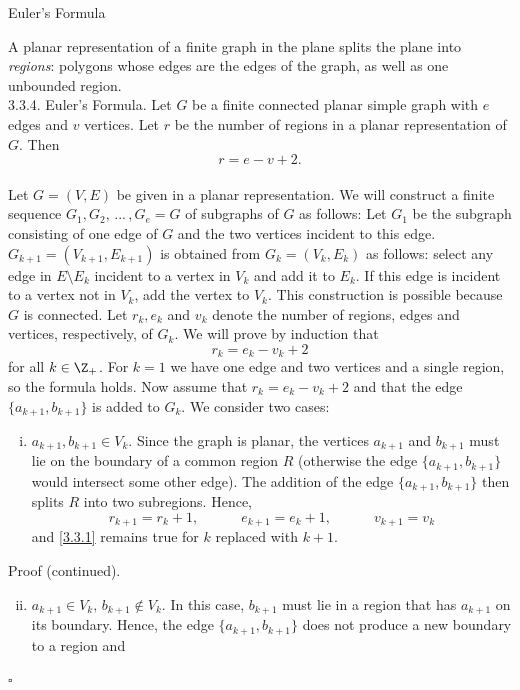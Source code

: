 \documentclass[smaller,hyperref={CJKbookmarks=true}]{beamer}
\newenvironment{PROOF}{{\noindent\!\sf\alert{Proof.}}\\}{\hfill$\square$\\}
\newcounter{zhuo}[subsection]
\begin{document}
\begin{frame}{Euler's Formula}
\begin{spacing}{1.05}
A planar representation of a finite graph in the plane splits the plane into \emph{regions}: polygons whose edges are the edges of the graph, as well as one
unbounded region.\\[5pt]
\alert{3.3.4. Euler's Formula.} Let $G$ be a finite connected planar simple graph
with $e$ edges and $v$ vertices. Let $r$ be the number of regions in a planar
representation of $G$. Then
\[r=e-v+2.\]
\begin{PROOF}
Let $G=(V,E)$ be given in a planar representation. We will construct a finite sequence $G_1,G_2,\,...\,,G_e=G$ of subgraphs of $G$ as follows: Let $G_1$ be the subgraph consisting of one edge of $G$ and the two vertices incident to this edge. $G_{k+1}=(V_{k+1},E_{k+1})$ is obtained from $G_k=(V_k,E_k)$ as follows: select any edge in $E\setminus E_k$ incident to a vertex in $V_k$ and add it to $E_k$. If this edge is incident to a vertex not in $V_k$, add the vertex to $V_k$. This construction is possible because $G$ is connected.
\newpage
Let $r_k,e_k$ and $v_k$ denote the number of regions, edges and vertices, respectively, of $G_k$. We will prove by induction that
\setcounter{equation}{0}
\begin{equation}\label{3.3.1}
r_k=e_k-v_k+2
\end{equation}
for all $k\in\Z_+$. For $k=1$ we have one edge and two vertices and a single region, so the formula holds. Now assume that $r_k=e_k-v_k+2$ and that the edge $\{a_{k+1},b_{k+1}\}$ is added to $G_k$. We consider two cases:
\begin{enumerate}[(i)]
  \item \alert{$a_{k+1},b_{k+1}\in V_k$.} Since the graph is planar, the vertices $a_{k+1}$ and $b_{k+1}$ must lie on the boundary of a common region $R$ (otherwise the edge $\{a_{k+1},b_{k+1}\}$ would intersect some other edge). The addition of the edge $\{a_{k+1},b_{k+1}\}$ then splits $R$ into two subregions. Hence,
      \[r_{k+1}=r_k+1,\qquad\quad e_{k+1}=e_k+1,\qquad\quad
      v_{k+1}=v_k\]
      and \eqref{3.3.1} remains true for $k$ replaced with $k+1$.
\end{enumerate}
\newpage
\alert{Proof (continued).}\\[5pt]
\begin{enumerate}[(i)]
\setcounter{enumi}{1}
  \item \alert{$a_{k+1}\in V_k,\,b_{k+1}\notin V_k$.} In this case, $b_{k+1}$ must lie in a region that has $a_{k+1}$ on its boundary. Hence, the edge $\{a_{k+1},b_{k+1}\}$ does not produce a new boundary to a region and

\end{enumerate}
\end{PROOF}
\end{spacing}
\end{frame}
\end{document}
